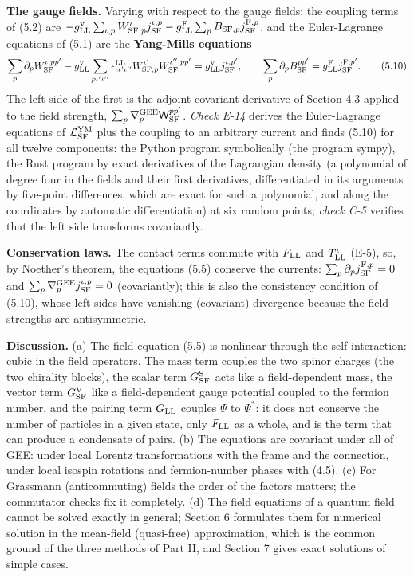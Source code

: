 \documentclass[
  10pt,
]{article}
\begin{document}
\textbf{The gauge fields.} Varying with respect to the gauge fields: the
coupling terms of (5.2) are
\(-g^{\rm v}_{\rm LL}\sum_{\iota,p}W^\iota_{{\rm SF},p}j^{\iota,p}_{\rm SF}-g^{\rm F}_{\rm LL}\sum_pB_{{\rm SF},p}j^{{\rm F},p}_{\rm SF}\),
and the Euler-Lagrange equations of (5.1) are the \textbf{Yang-Mills
equations}
\[\sum_p\partial_pW^{\iota,pp'}_{\rm SF}-g^{\rm v}_{\rm LL}\sum_{p\iota'\iota''}\epsilon^{\rm LL}_{\iota\iota'\iota''}W^{\iota'}_{{\rm SF},p}W^{\iota'',pp'}_{\rm SF}=g^{\rm v}_{\rm LL}j^{\iota,p'}_{\rm SF},\qquad\sum_p\partial_pB^{pp'}_{\rm SF}=g^{\rm F}_{\rm LL}j^{{\rm F},p'}_{\rm SF}.\tag{5.10}\]
The left side of the first is the adjoint covariant derivative of
Section 4.3 applied to the field strength,
\(\sum_p\nabla^{\rm GEE}_p\mathsf W^{pp'}_{\rm SF}\). \emph{Check E-14}
derives the Euler-Lagrange equations of \(\mathcal L^{\rm YM}_{\rm SF}\)
plus the coupling to an arbitrary current and finds (5.10) for all
twelve components: the Python program symbolically (the program sympy),
the Rust program by exact derivatives of the Lagrangian density (a
polynomial of degree four in the fields and their first derivatives,
differentiated in its arguments by five-point differences, which are
exact for such a polynomial, and along the coordinates by automatic
differentiation) at six random points; \emph{check C-5} verifies that
the left side transforms covariantly.

\textbf{Conservation laws.} The contact terms commute with
\(F_{\rm LL}\) and \(T^\iota_{\rm LL}\) (E-5), so, by Noether's theorem,
the equations (5.5) conserve the currents:
\(\sum_p\partial_pj^{{\rm F},p}_{\rm SF}=0\) and
\(\sum_p\nabla^{\rm GEE}_pj^{\iota,p}_{\rm SF}=0\) (covariantly); this
is also the consistency condition of (5.10), whose left sides have
vanishing (covariant) divergence because the field strengths are
antisymmetric.

\textbf{Discussion.} (a) The field equation (5.5) is nonlinear through
the self-interaction: cubic in the field operators. The mass term
couples the two spinor charges (the two chirality blocks), the scalar
term \(G^{\rm S}_{\rm SF}\) acts like a field-dependent mass, the vector
term \(G^{\rm V}_{\rm SF}\) like a field-dependent gauge potential
coupled to the fermion number, and the pairing term \(G_{\rm LL}\)
couples \(\Psi\) to \(\Psi^*\): it does not conserve the number of
particles in a given state, only \(F_{\rm LL}\) as a whole, and is the
term that can produce a condensate of pairs. (b) The equations are
covariant under all of GEE: under local Lorentz transformations with the
frame and the connection, under local isospin rotations and
fermion-number phases with (4.5). (c) For Grassmann (anticommuting)
fields the order of the factors matters; the commutator checks fix it
completely. (d) The field equations of a quantum field cannot be solved
exactly in general; Section 6 formulates them for numerical solution in
the mean-field (quasi-free) approximation, which is the common ground of
the three methods of Part II, and Section 7 gives exact solutions of
simple cases.
\end{document}
